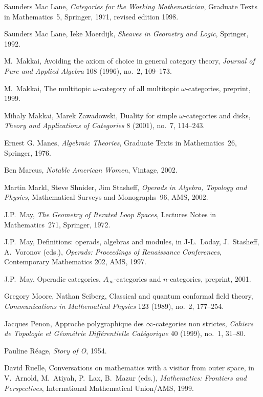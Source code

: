 \begin{thebibliography}{c9999}
Saunders Mac Lane,
\emph{Categories for the Working Mathematician},
Graduate Texts in Mathematics~5, Springer, 1971, revised edition 1998.

Saunders Mac Lane, Ieke Moerdijk,
\emph{Sheaves in Geometry and Logic},
Springer, 1992.

M.~Makkai,
Avoiding the axiom of choice in general category theory,
\emph{Journal of Pure and Applied Algebra} 108 (1996), no.~2, 109--173.

M.~Makkai,
The multitopic $\omega$-category of all multitopic $\omega$-categories,
preprint, 1999.

Mihaly Makkai, Marek Zawadowski, 
Duality for simple $\omega$-categories and disks,
\emph{Theory and Applications of Categories} 8 (2001), no.~7, 114--243.

Ernest G. Manes, 
\emph{Algebraic Theories},
Graduate Texts in Mathematics~26,
Springer, 1976.

Ben Marcus,
\emph{Notable American Women},
Vintage, 2002.

Martin Markl, Steve Shnider, Jim Stasheff, 
\emph{Operads in Algebra, Topology and Physics},
Mathematical Surveys and Monographs~96,
AMS, 2002.

J.P.~May, 
\emph{The Geometry of Iterated Loop Spaces},
Lectures Notes in Mathematics~271, Springer, 1972.

J.P.~May,
Definitions: operads, algebras and modules, 
in 
J-L.~Loday, J.~Stasheff, A.~Voronov (eds.), \emph{Operads: Proceedings
of Renaissance Conferences}, 
Contemporary Mathematics 202, AMS, 1997. 

J.P.~May, 
Operadic categories, $A_\infty$-categories and $n$-categories,
preprint, 2001.

Gregory Moore, Nathan Seiberg, 
Classical and quantum conformal field theory,
\emph{Communications in Mathematical Physics} 123 (1989), no.~2, 177--254.

Jacques Penon, 
Approche polygraphique des $\infty$-categories non strictes, 
\emph{Cahiers de Topologie et G\'eom\'etrie Diff\'erentielle Cat\'egorique}
40 (1999), no.~1, 31--80.

Pauline R\'eage, 
\emph{Story of O},
1954.

David Ruelle, 
Conversations on mathematics with a visitor from outer space,
in V.~Arnold, M.~Atiyah, P.~Lax, B.~Mazur (eds.), 
\emph{Mathematics: Frontiers and Perspectives}, International Mathematical
Union/AMS, 1999.


\end{thebibliography}
